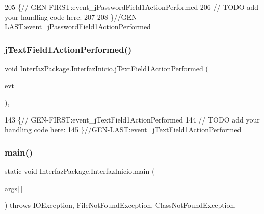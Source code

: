 \begin{DoxyCode}
205                                                                                 \{\textcolor{comment}{//
      GEN-FIRST:event\_jPasswordField1ActionPerformed}
206         \textcolor{comment}{// TODO add your handling code here:}
207         
208     \}\textcolor{comment}{//GEN-LAST:event\_jPasswordField1ActionPerformed}
\end{DoxyCode}
\mbox{\label{class_interfaz_package_1_1_interfaz_inicio_ae2b72822ed503b0e83050f35f8efd996}} 
\subsubsection{\texorpdfstring{j\+Text\+Field1\+Action\+Performed()}{jTextField1ActionPerformed()}}
{\footnotesize\ttfamily void Interfaz\+Package.\+Interfaz\+Inicio.\+j\+Text\+Field1\+Action\+Performed (\begin{DoxyParamCaption}\item[{java.\+awt.\+event.\+Action\+Event}]{evt }\end{DoxyParamCaption})\hspace{0.3cm}{\ttfamily [inline]}, {\ttfamily [private]}}


\begin{DoxyCode}
143                                                                             \{\textcolor{comment}{//
      GEN-FIRST:event\_jTextField1ActionPerformed}
144         \textcolor{comment}{// TODO add your handling code here:}
145     \}\textcolor{comment}{//GEN-LAST:event\_jTextField1ActionPerformed}
\end{DoxyCode}
\mbox{\label{class_interfaz_package_1_1_interfaz_inicio_a335dc084531a04e4d10683639438e1ec}} 
\subsubsection{\texorpdfstring{main()}{main()}}
{\footnotesize\ttfamily static void Interfaz\+Package.\+Interfaz\+Inicio.\+main (\begin{DoxyParamCaption}\item[{String}]{args\mbox{[}$\,$\mbox{]} }\end{DoxyParamCaption}) throws I\+O\+Exception, File\+Not\+Found\+Exception, Class\+Not\+Found\+Exception\hspace{0.3cm}{\ttfamily [inline]}, {\ttfamily [static]}}


